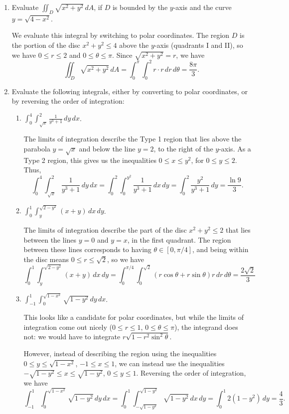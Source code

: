 \documentclass[letterpaper,12pt]{article}
\newcommand{\di}{\displaystyle}
\begin{document}
\begin{enumerate}
\item Evaluate $\iint_D \sqrt{x^2+y^2}\,dA$, if $D$ is bounded by the $y$-axis and the curve $y=\sqrt{4-x^2}$.

\bigskip

We evaluate this integral by switching to polar coordinates. The region $D$ is the portion of the disc $x^2+y^2\leq 4$ above the $y$-axis (quadrants I and II), so we have $0\leq r\leq 2$ and $0\leq \theta\leq \pi$. Since $\sqrt{x^2+y^2}=r$, we have
\[
 \iint_D\sqrt{x^2+y^2}\,dA = \int_0^\pi \int_0^2 r\cdot r\,dr\,d\theta = \frac{8\pi}{3}.
\]



\item Evaluate the following integrals, either by converting to polar coordinates, or by reversing the order of integration:
\begin{enumerate}
\item $\di \int_0^4\int_{\sqrt{x}}^2 \frac{1}{y^3+1}\,dy\,dx$.

\bigskip

The limits of integration describe the Type 1 region that lies above the parabola $y=\sqrt{x}$ and below the line $y=2$, to the right of the $y$-axis. As a Type 2 region, this gives us the inequalities $0\leq x\leq y^2$, for $0\leq y\leq 2$. Thus,
\[
 \int_0^4\int_{\sqrt{x}}^2 \frac{1}{y^3+1}\,dy\,dx = \int_0^2\int_0^{y^2}\frac{1}{y^3+1}\,dx\,dy = \int_0^2\frac{y^2}{y^3+1}\,dy = \frac{\ln 9}{3}.
\]

\item $\di \int_0^1\int_y^{\sqrt{2-y^2}}(x+y)\,dx\,dy$.

\bigskip

The limits of integration describe the part of the disc $x^2+y^2\leq 2$ that lies between the lines $y=0$ and $y=x$, in the first quadrant. The region between these lines corresponds to having $\theta\in [0,\pi/4]$, and being within the disc means $0\leq r\leq \sqrt{2}$, so we have
\[
 \int_0^1\int_y^{\sqrt{2-y^2}}(x+y)\,dx\,dy = \int_0^{\pi/4}\int_0^{\sqrt{2}}(r\cos\theta+r\sin\theta)r\,dr\,d\theta = \frac{2\sqrt{2}}{3}
\]


\item $\di \int_{-1}^1\int_0^{\sqrt{1-x^2}}\sqrt{1-y^2}\,dy\,dx$.

\bigskip

This looks like a candidate for polar coordinates, but while the limits of integration come out nicely ($0\leq r\leq 1$, $0\leq \theta\leq \pi$), the integrand does not: we would have to integrate $r\sqrt{1-r^2\sin^2\theta}$.

However, instead of describing the region using the inequalities $0\leq y\leq \sqrt{1-x^2}$, $-1\leq x\leq 1$, we can instead use the inequalities $-\sqrt{1-y^2}\leq x\leq \sqrt{1-y^2}$, $0\leq y\leq 1$. Reversing the order of integration, we have
\[
 \int_{-1}^1\int_0^{\sqrt{1-x^2}}\sqrt{1-y^2}\,dy\,dx = \int_0^1\int_{-\sqrt{1-y^2}}^{\sqrt{1-y^2}}\sqrt{1-y^2}\,dx\,dy = \int_0^1 2(1-y^2)\,dy = \frac{4}{3}.
\]

\end{enumerate}
\end{enumerate}
\end{document}
